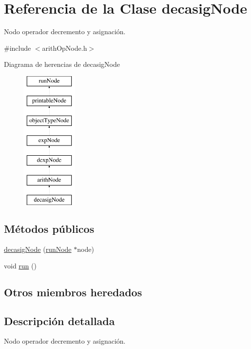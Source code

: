 \hypertarget{classdecasigNode}{\section{Referencia de la Clase decasig\-Node}
\label{classdecasigNode}
}


Nodo operador decremento y asignación.  




{\ttfamily \#include $<$arith\-Op\-Node.\-h$>$}

Diagrama de herencias de decasig\-Node\begin{figure}[H]
\begin{center}
\leavevmode
\includegraphics[height=7.000000cm]{classdecasigNode}
\end{center}
\end{figure}
\subsection*{Métodos públicos}
\begin{DoxyCompactItemize}
\item 
\hyperlink{classdecasigNode_aac7063a27fc37eaae22f4d66266bf800}{decasig\-Node} (\hyperlink{classrunNode}{run\-Node} $\ast$node)
\item 
void \hyperlink{classdecasigNode_ac45f48e8d9866816c2efae4eed38d833}{run} ()
\end{DoxyCompactItemize}
\subsection*{Otros miembros heredados}


\subsection{Descripción detallada}
Nodo operador decremento y asignación. 

